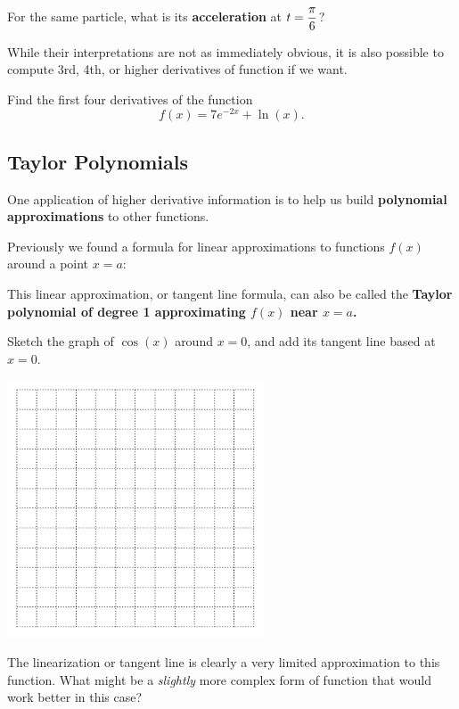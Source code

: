 \vfill

For the same particle, what is its {\bf acceleration} at
$\displaystyle t=\frac{\pi}{6}$?

\vfill

\newpage



While their interpretations are not as immediately obvious, it is also
possible to compute 3rd, 4th, or higher derivatives of function if we
want.

\problem Find the first four derivatives of the function
$$f(x) = 7 e^{-2x} + \ln(x).$$


\newpage
{}
\subsection*{Taylor Polynomials}

One application of higher derivative information is to help us build
{\bf polynomial approximations} to other functions.

Previously we found a formula for linear approximations to functions
$f(x)$ around a point $x=a$:

\vspace{1.5in}

This linear approximation, or tangent line formula, can also be called
the {\bf Taylor polynomial of degree 1 approximating $f(x)$ near
  $x=a$.}

\newpage

\problem Sketch the graph of $\cos(x)$ around $x=0$, and add its
tangent line based at $x=0$.

\includegraphics[width=3in]{graphics/empty_graph_square_12}


The linearization or tangent line is clearly a very
  limited approximation to this function.  What might be a {\em
    slightly} more complex form of function that would work better in
  this case?

